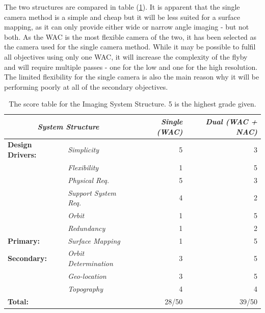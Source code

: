 The two structures are compared in table (\ref{tab:score_system_structure}). It is apparent that the single camera method is a simple and cheap but it will be less suited for a surface mapping, as it can only provide either wide or narrow angle imaging - but not both. As the WAC is the most flexible camera of the two, it has been selected as the camera used for the single camera method. While it may be possible to fulfil all objectives using only one WAC, it will increase the complexity of the flyby and will require multiple passes - one for the low and one for the high resolution. The limited flexibility for the single camera is also the main reason why it will be performing poorly at all of the secondary objectives.
\begin{table}[h!]
  \centering
    \begin{tabular}{l|l|rr}
    \multicolumn{2}{c|}{\textit{\textbf{System Structure}}} & \textit{Single (WAC)} & \textit{Dual (WAC + NAC)} \bigstrut[b]\\
    \hline
    \textbf{Design Drivers:} & \textit{Simplicity} & 5     & 3 \bigstrut[t]\\
          & \textit{Flexibility} & 1     & 5 \\
          & \textit{Physical Req.} & 5     & 3 \\
          & \textit{Support System Req.} & 4     & 2 \\
          & \textit{Orbit} & 1     & 5 \\
          & \textit{Redundancy} & 1     & 2 \bigstrut[b]\\
    \hline
    \textbf{Primary:} & \textit{Surface Mapping} & 1     & 5 \bigstrut\\
    \hline
    \textbf{Secondary:} & \textit{Orbit Determination} & 3     & 5 \bigstrut[t]\\
          & \textit{Geo-location} & 3     & 5 \\
          & \textit{Topography} & 4     & 4 \bigstrut[b]\\
    \hline
    \multicolumn{1}{l}{\textbf{Total:}} & \textit{\textbf{}} & 28/50 & 39/50 \bigstrut[t]\\
    \end{tabular}%
  \caption{The score table for the Imaging System Structure. 5 is the highest grade given.}
  \label{tab:score_system_structure}%
\end{table}%

